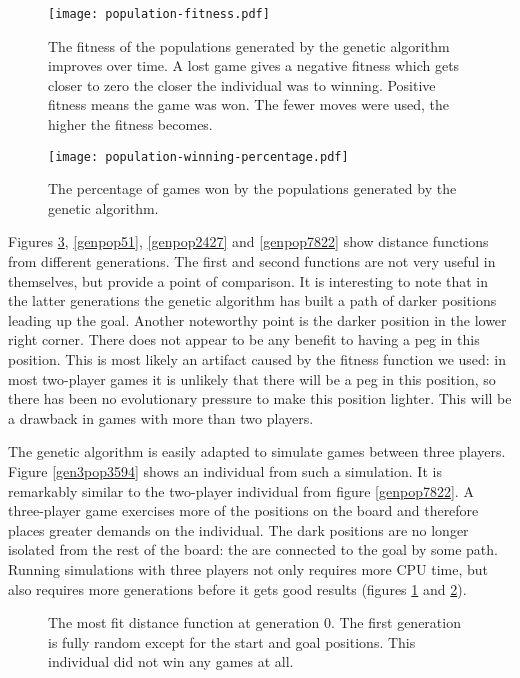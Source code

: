 \documentclass[a4paper,11pt]{article}
\begin{document}
\begin{figure}
\centering
\texttt{[image: population-fitness.pdf]}
\caption{The fitness of the populations generated by the genetic
  algorithm improves over time. A lost game gives a negative fitness
  which gets closer to zero the closer the individual was to winning.
  Positive fitness means the game was won. The fewer moves were
  used, the higher the fitness becomes.}
\label{fitness}
\end{figure}

\begin{figure}
\centering
\texttt{[image: population-winning-percentage.pdf]}
\caption{The percentage of games won by the populations generated by
  the genetic algorithm.}
\label{winning}
\end{figure}

Figures \ref{genpop0}, \ref{genpop51}, \ref{genpop2427} and
\ref{genpop7822} show distance functions from different generations.
The first and second functions are not very useful in themselves, but
provide a point of comparison. It is interesting to note that in the
latter generations the genetic algorithm has built a path of darker
positions leading up the goal. Another noteworthy point is the darker
position in the lower right corner. There does not appear to be any
benefit to having a peg in this position. This is most likely an
artifact caused by the fitness function we used: in most two-player
games it is unlikely that there will be a peg in this position, so
there has been no evolutionary pressure to make this position lighter.
This will be a drawback in games with more than two players.

The genetic algorithm is easily adapted to simulate games between
three players. Figure \ref{gen3pop3594} shows an individual from such
a simulation. It is remarkably similar to the two-player individual
from figure \ref{genpop7822}. A three-player game exercises more of
the positions on the board and therefore places greater demands on the
individual. The dark positions are no longer isolated from the rest of
the board: the are connected to the goal by some path. Running
simulations with three players not only requires more CPU time, but
also requires more generations before it gets good results (figures
\ref{fitness} and \ref{winning}).

\begin{figure}
\centering

\caption{The most fit distance function at generation 0. The first
  generation is fully random except for the start and goal positions.
  This individual did not win any games at all.}
\label{genpop0}
\end{figure}
\end{document}
